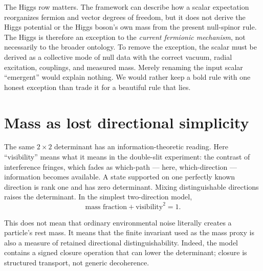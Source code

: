 \documentclass[11pt]{article}
\begin{document}
The Higgs row matters.  The framework can describe how a scalar expectation
reorganizes fermion and vector degrees of freedom, but it does not derive the
Higgs potential or the Higgs boson's own mass from the present null-spinor
rule.  The Higgs is therefore an exception to the \emph{current fermionic
mechanism}, not necessarily to the broader ontology.  To remove the exception,
the scalar must be derived as a collective mode of null data with the correct
vacuum, radial excitation, couplings, and measured mass.  Merely renaming the
input scalar ``emergent'' would explain nothing.  We would rather keep a bold
rule with one honest exception than trade it for a beautiful rule that lies.

\section{Mass as lost directional simplicity}

The same $2\times2$ determinant has an information-theoretic reading.  Here
``visibility'' means what it means in the double-slit experiment: the contrast
of interference fringes, which fades as which-path --- here, which-direction
--- information becomes available.  A state
supported on one perfectly known direction is rank one and has zero determinant.
Mixing distinguishable directions raises the determinant.  In the simplest
two-direction model,
\[
  \text{mass fraction}+\text{visibility}^2=1.
\]

\begin{center}
\end{center}

This does not mean that ordinary environmental noise literally creates a
particle's rest mass.  It means that the finite invariant used as the mass
proxy is also a measure of retained directional distinguishability.  Indeed,
the model contains a signed closure operation that can lower the determinant;
closure is structured transport, not generic decoherence.
\end{document}
